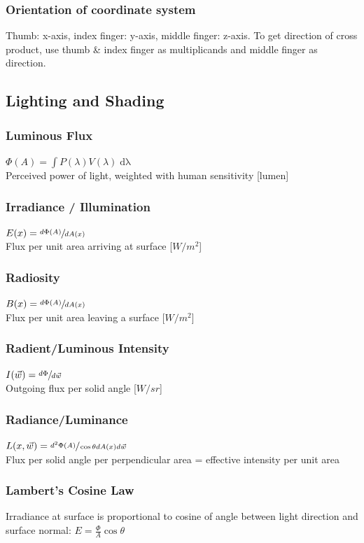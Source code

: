 \documentclass[a4paper,10pt]{article}
\begin{document}
\subsubsection{Orientation of coordinate system}
Thumb: x-axis, index finger: y-axis, middle finger: z-axis. To get direction of cross product, use thumb \& index finger as multiplicands and middle finger as direction.

\subsection{Lighting and Shading}
\subsubsection{Luminous Flux} \( \Phi(A) = \int P(\lambda)V(\lambda) \mathop{d\lambda} \) \\
Perceived power of light, weighted with human sensitivity [lumen] 
\subsubsection{Irradiance / Illumination} \( E(x) = \sfrac{d \Phi(A)}{dA(x)} \) \\
Flux per unit area arriving at surface [\( \unit{W /m^2} \)]
\subsubsection{Radiosity} \( B(x) = \sfrac{d \Phi (A)}{dA(x)} \) \\
Flux per unit area leaving a surface [\( \unit{W/m^2} \)]
\subsubsection{Radient/Luminous Intensity} \( I(\vec{w}) = \sfrac{d \Phi}{d \vec{w}} \) \\
Outgoing flux per solid angle [\( \unit{W/sr} \)]
\subsubsection{Radiance/Luminance} \( L(x, \vec{w}) = \sfrac{d^2 \Phi (A)}{\cos \theta d A(x) d \vec{w}} \) \\
Flux per solid angle per perpendicular area = effective intensity per unit area
\subsubsection{Lambert's Cosine Law} Irradiance at surface is proportional to cosine of angle between light direction and surface normal: \( E = \frac{\Phi}{A} \cos \theta  \)
\end{document}
